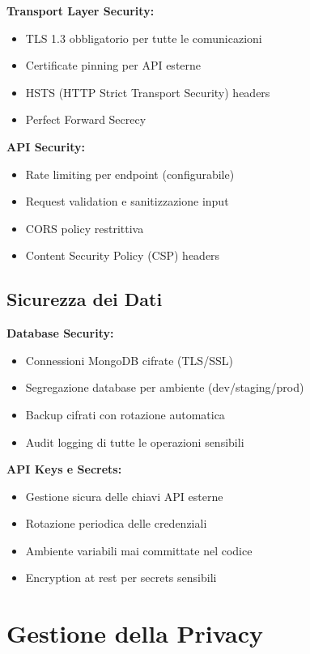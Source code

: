 \documentclass[12pt,a4paper]{report}
\begin{document}
\textbf{Transport Layer Security:}
\begin{itemize}
    \item TLS 1.3 obbligatorio per tutte le comunicazioni
    \item Certificate pinning per API esterne
    \item HSTS (HTTP Strict Transport Security) headers
    \item Perfect Forward Secrecy
\end{itemize}

\textbf{API Security:}
\begin{itemize}
    \item Rate limiting per endpoint (configurabile)
    \item Request validation e sanitizzazione input
    \item CORS policy restrittiva
    \item Content Security Policy (CSP) headers
\end{itemize}

\subsection{Sicurezza dei Dati}

\textbf{Database Security:}
\begin{itemize}
    \item Connessioni MongoDB cifrate (TLS/SSL)
    \item Segregazione database per ambiente (dev/staging/prod)
    \item Backup cifrati con rotazione automatica
    \item Audit logging di tutte le operazioni sensibili
\end{itemize}

\textbf{API Keys e Secrets:}
\begin{itemize}
    \item Gestione sicura delle chiavi API esterne
    \item Rotazione periodica delle credenziali
    \item Ambiente variabili mai committate nel codice
    \item Encryption at rest per secrets sensibili
\end{itemize}

\section{Gestione della Privacy}
\end{document}
